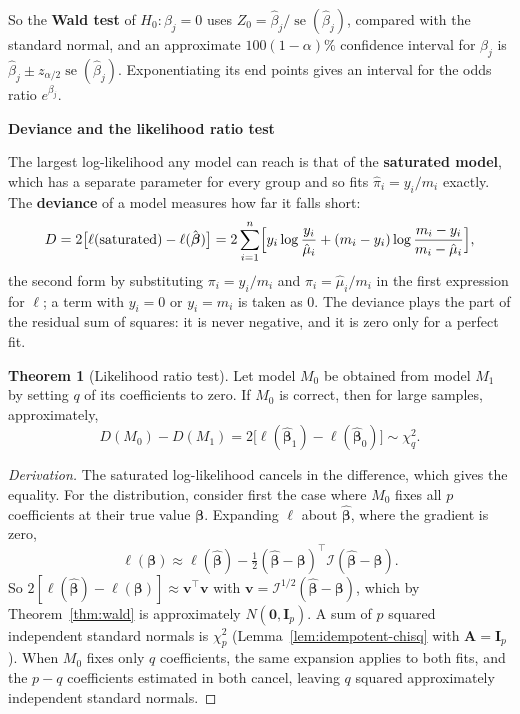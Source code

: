 \documentclass[11pt,a4paper]{article}
\numberwithin{equation}{section}
\theoremstyle{definition}
\newtheorem{thm}{Theorem}[subsection]
\newcommand{\subhead}[1]{%
  \par\medskip\noindent\textbf{#1}\par\nobreak\smallskip}
\begin{document}
So the \textbf{Wald test} of $H_0\colon \beta_j = 0$ uses $Z_0 = \hat\beta_j/\operatorname{se}(\hat\beta_j)$, compared with the standard normal, and an
approximate $100(1 - \alpha)\%$ confidence interval for $\beta_j$ is $\hat\beta_j \pm z_{\alpha/2}\operatorname{se}(\hat\beta_j)$. Exponentiating its end
points gives an interval for the odds ratio $e^{\beta_j}$.

\subhead{Deviance and the likelihood ratio test}
The largest log-likelihood any model can reach is that of the \textbf{saturated model}, which has a separate
parameter for every group and so fits $\hat\pi_i = y_i/m_i$ exactly. The \textbf{deviance} of a model measures how far
it falls short:
\[
D = 2\bigl[\ell(\text{saturated}) - \ell(\hat{\boldsymbol\beta})\bigr]
= 2\sum_{i=1}^n\Bigl[y_i\log\frac{y_i}{\hat\mu_i} + (m_i - y_i)\log\frac{m_i - y_i}{m_i - \hat\mu_i}\Bigr] ,
\]
the second form by substituting $\pi_i = y_i/m_i$ and $\pi_i = \hat\mu_i/m_i$ in the first expression for $\ell$; a term with
$y_i = 0$ or $y_i = m_i$ is taken as $0$. The deviance plays the part of the residual sum of squares: it is never negative,
and it is zero only for a perfect fit.

\begin{thm}[Likelihood ratio test]\label{thm:lr-test}
Let model $M_0$ be obtained from model $M_1$ by setting $q$ of its coefficients to zero. If $M_0$ is correct,
then for large samples, approximately,
\[
D(M_0) - D(M_1) = 2\bigl[\ell(\hat{\boldsymbol\beta}_1) - \ell(\hat{\boldsymbol\beta}_0)\bigr] \sim \chi^2_q .
\]
\end{thm}

\begin{proof}[Derivation]
The saturated log-likelihood cancels in the difference, which gives the equality. For the distribution,
consider first the case where $M_0$ fixes all $p$ coefficients at their true value $\boldsymbol\beta$. Expanding $\ell$ about $\hat{\boldsymbol\beta}$,
where the gradient is zero,
\[
\ell(\boldsymbol\beta) \approx \ell(\hat{\boldsymbol\beta}) - \tfrac12(\hat{\boldsymbol\beta} - \boldsymbol\beta)^\top\mathcal{I}(\hat{\boldsymbol\beta} - \boldsymbol\beta) .
\]
So $2[\ell(\hat{\boldsymbol\beta}) - \ell(\boldsymbol\beta)] \approx \mathbf{v}^\top\mathbf{v}$ with $\mathbf{v} = \mathcal{I}^{1/2}(\hat{\boldsymbol\beta} - \boldsymbol\beta)$, which by Theorem~\ref{thm:wald} is
approximately $N(\mathbf{0}, \mathbf{I}_p)$. A sum of $p$ squared independent standard normals is $\chi^2_p$
(Lemma~\ref{lem:idempotent-chisq} with $\mathbf{A} = \mathbf{I}_p$). When $M_0$ fixes only $q$ coefficients, the same expansion applies to
both fits, and the $p - q$ coefficients estimated in both cancel, leaving $q$ squared approximately
independent standard normals.
\end{proof}
\end{document}
